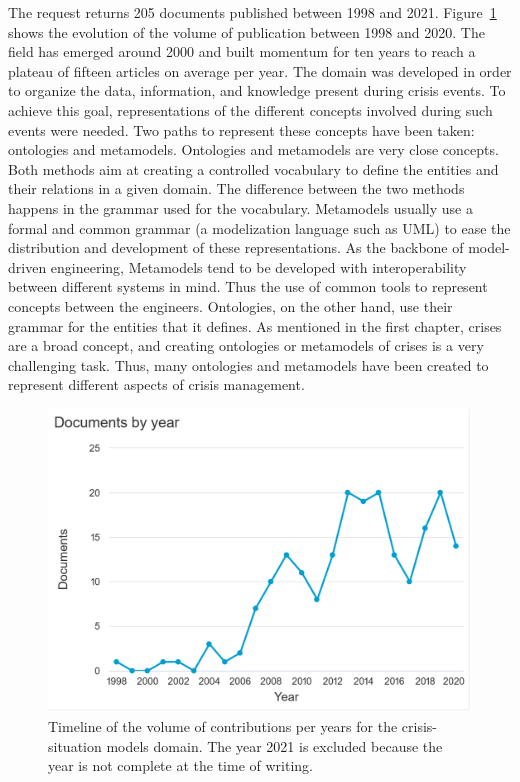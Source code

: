 The request returns 205 documents published between 1998 and 2021.
Figure~\ref{literature:situation-models-hist} shows the evolution of the volume of publication between 1998 and 2020.
The field has emerged around 2000 and built momentum for ten years to reach a plateau of fifteen articles on average per year.
The domain was developed in order to organize the data, information, and knowledge present during crisis events.
To achieve this goal, representations of the different concepts involved during such events were needed.
Two paths to represent these concepts have been taken: ontologies and metamodels.
Ontologies and metamodels are very close concepts.
Both methods aim at creating a controlled vocabulary to define the entities and their relations in a given domain.
The difference between the two methods happens in the grammar used for the vocabulary.
Metamodels usually use a formal and common grammar (a modelization language such as UML) to ease the distribution and development of these representations.
As the backbone of model-driven engineering, Metamodels tend to be developed with interoperability between different systems in mind.
Thus the use of common tools to represent concepts between the engineers.
Ontologies, on the other hand, use their grammar for the entities that it defines.
As mentioned in the first chapter, crises are a broad concept, and creating ontologies or metamodels of crises is a very challenging task.
Thus, many ontologies and metamodels have been created to represent different aspects of crisis management.

\begin{figure}[htb]
    \includegraphics[width=\textwidth]{figures/chap-2/situation-models-hist.pdf}
    \caption{Timeline of the volume of contributions per years for the crisis-situation models domain. The year 2021 is excluded because the year is not complete at the time of writing.}
    \label{literature:situation-models-hist}
\end{figure}

